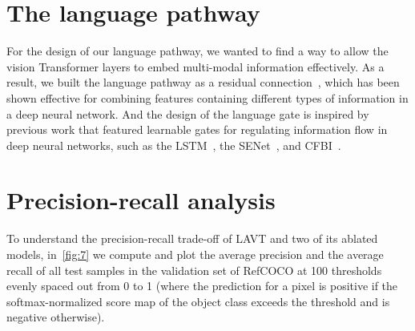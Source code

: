 \documentclass[10pt,twocolumn,letterpaper]{article}
\begin{document}
\section{The language pathway} \label{sec:lpa}
For the design of our language pathway, we wanted to find a way to allow the vision Transformer layers to embed multi-modal information effectively.
As a result, we built the language pathway as a residual connection~\cite{fpn,he2016deep}, which has been shown effective for combining features containing different types of information in a deep neural network.
And the design of the language gate is inspired by previous work that featured learnable gates for regulating information flow in deep neural networks, such as the LSTM~\cite{lstm}, the SENet~\cite{hu2018squeeze}, and CFBI~\cite{yang2020CFBI}.

\begin{table}[h]
   \centering
   \caption{Design alternatives for the language pathway (annotated with the asterisk). `LG' is short for language gate. `--' indicates that training suffered extremely slow convergence.}
   \label{tab:5}
\end{table}


\section{Precision-recall analysis} \label{sec:pr}
To understand the precision-recall trade-off of LAVT and two of its ablated models, in~\cref{fig:7} we compute and plot the average precision and the average recall of all test samples in the validation set of RefCOCO at 100 thresholds evenly spaced out from 0 to 1 (where the prediction for a pixel is positive if the softmax-normalized score map of the object class exceeds the threshold and is negative otherwise).
\end{document}

